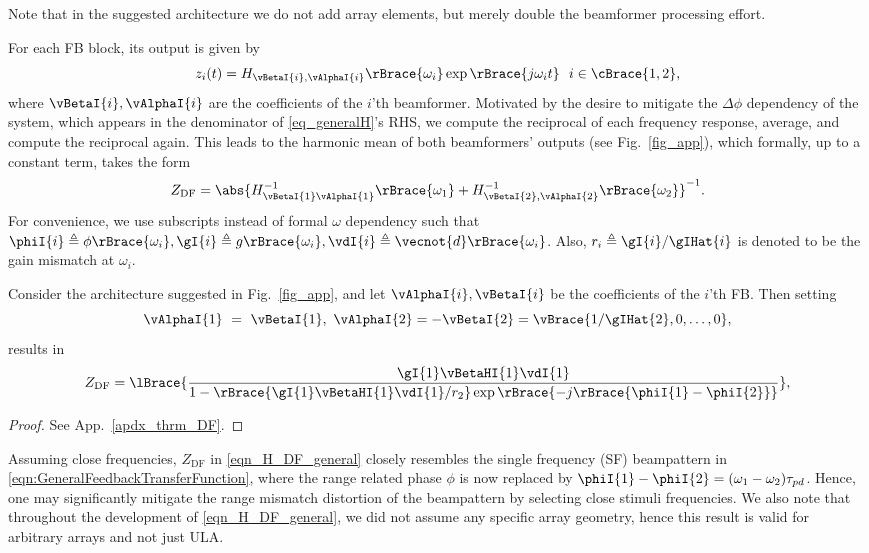 Note that in the suggested architecture we do not add array elements, but merely double the beamformer processing effort. 
\par For each FB block, its output is given by
\[
z_{i}(t)=H_{\vBetaI{i},\vAlphaI{i}}\rBrace{\omega_{i}}\exp{\rBrace{j\omega_{i}t}}\ \ {i\in\cBrace{1,2}},
\]
where $\vBetaI{i},\vAlphaI{i}$ are the coefficients of the $i$'th beamformer.
Motivated by the desire to mitigate the $\Delta\phi$ dependency of the system, which appears in the denominator of \eqref{eq_generalH}'s RHS, we compute the reciprocal of each frequency response, average, and compute the reciprocal again. This leads to the harmonic mean of both beamformers' outputs (see Fig.~\ref{fig_app}), which formally, up to a constant term, takes the form
\begin{equation}
    \label{eqn_HDF_def}
    Z_{\text{DF}} = \abs{H^{-1}_{\vBetaI{1}\vAlphaI{1}}\rBrace{\omega_{1}}+H^{-1}_{\vBetaI{2},\vAlphaI{2}}\rBrace{\omega_{2}}}^{-1}.
\end{equation}
For convenience, we use subscripts instead of formal $\omega$ dependency such that $\phiI{i}\triangleq\phi\rBrace{\omega_{i}}, \gI{i}\triangleq{}g\rBrace{\omega_{i}}, \vdI{i}\triangleq\vecnot{d}\rBrace{\omega_{i}}$.
Also, $r_i\triangleq{}\gI{i}/\gIHat{i}$ is denoted to be the gain mismatch at $\omega_i$.

\begin{theorem}
\label{thrm_DF}
Consider the architecture suggested in Fig.~\ref{fig_app}, and let \textit{$\vAlphaI{i},\vBetaI{i}$} be the coefficients of the $i$'th FB. Then setting 
\begin{equation}\label{eqn_simpleBeta}
    \vAlphaI{1}~=~\vBetaI{1},\ \vAlphaI{2}=-\vBetaI{2}=\vBrace{1/\gIHat{2},0,\hdots,0},
\end{equation}
results in 
\begin{equation}
    Z_{\text{DF}} = \lBrace{\frac{\gI{1}\vBetaHI{1}\vdI{1}}{1-
    \rBrace{\gI{1}\vBetaHI{1}\vdI{1}/r_{2}}\exp\rBrace{-j\rBrace{\phiI{1}-\phiI{2}}}
    }},
    \label{eqn_H_DF_general}
\end{equation}
\end{theorem}

\begin{proof}
See App.~\ref{apdx_thrm_DF}. 
\end{proof}
\par Assuming close frequencies, $Z_{\text{DF}}$ in  \eqref{eqn_H_DF_general} closely resembles the single frequency (SF) beampattern in  \eqref{eqn:GeneralFeedbackTransferFunction}, where the range related phase $\phi$ is now replaced by  $\phiI{1}-\phiI{2}=(\omega_1-\omega_2)\tau_{pd}$. 
Hence, one may significantly mitigate the range mismatch distortion of the beampattern by selecting close stimuli frequencies.
We also note that throughout the development of \eqref{eqn_H_DF_general}, we did not assume any specific array geometry, hence this result is valid for arbitrary arrays and not just ULA.
